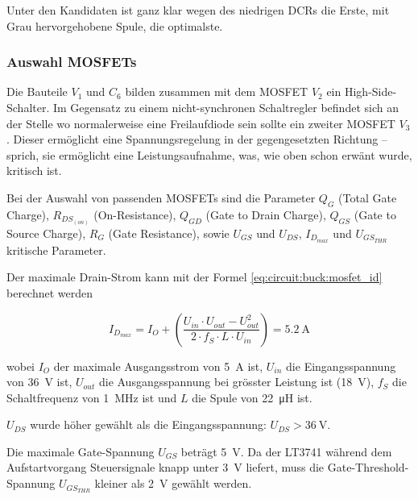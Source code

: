 Unter den Kandidaten ist ganz klar wegen des niedrigen DCRs die Erste,  mit Grau
hervorgehobene Spule, die optimalste.

\subsubsection*{Auswahl MOSFETs}

Die  Bauteile  $V_1$  und  $C_6$  bilden  zusammen  mit  dem  MOSFET  $V_2$  ein
High-Side-Schalter. Im Gegensatz zu einem nicht-synchronen Schaltregler befindet
sich  an  der Stelle wo normalerweise eine Freilaufdiode sein sollte ein zweiter
MOSFET $V_3$. Dieser erm\"oglicht  eine  Spannungsregelung in der gegengesetzten
Richtung -- sprich, sie erm\"oglicht eine Leistungsaufnahme, was, wie oben schon
erw\"ant wurde, kritisch ist.

Bei  der  Auswahl von passenden MOSFETs sind die  Parameter  $Q_G$  (Total  Gate
Charge),  $R_{DS_{(on)}}$  (On-Resistance),  $Q_{GD}$  (Gate to  Drain  Charge),
$Q_{GS}$ (Gate to Source  Charge),  $R_G$  (Gate Resistance), sowie $U_{GS}$ und
$U_{DS}$, $I_{D_{max}}$ und $U_{GS_{THR}}$ kritische Parameter.

Der  maximale  Drain-Strom  kann mit der Formel  \ref{eq:circuit:buck:mosfet_id}
berechnet werden

\begin{equation}
    I_{D_{max}} = I_O + \left( \frac{U_{in} \cdot U_{out} - U_{out}^2}{2 \cdot f_S \cdot L \cdot U_{in}} \right) = \SI{5.2}{\ampere}
    \label{eq:circuit:buck:mosfet_id}
\end{equation}

wobei $I_O$ der maximale Ausgangsstrom  von  \SI{5}{\ampere}  ist,  $U_{in}$ die
Eingangsspannung von  \SI{36}{\volt}  ist,  $U_{out}$  die  Ausgangsspannung bei
gr\"osster  Leistung  ist   (\SI{18}{\volt}),   $f_S$   die  Schaltfrequenz  von
\SI{1}{\mega\hertz}  ist  und  $L$  die  Spule  von  \SI{22}{\micro\henry}  ist.

$U_{DS}$   wurde   h\"oher  gew\"ahlt  als  die  Eingangsspannung:   $U_{DS}   >
\SI{36}{\volt}$.

Die maximale  Gate-Spannung  $U_{GS}$  betr\"agt  \SI{5}{\volt}.  Da  der LT3741
w\"ahrend  dem Aufstartvorgang Steuersignale knapp unter \SI{3}{\volt}  liefert,
muss  die  Gate-Threshold-Spannung  $U_{GS_{THR}}$  kleiner   als  \SI{2}{\volt}
gew\"ahlt werden.

